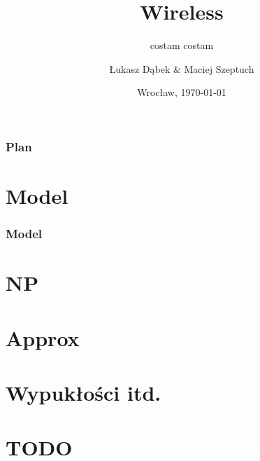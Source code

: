\documentclass[slidestop, compress, 10pt]{beamer}
\title{Wireless}
\subtitle{costam costam}
\author{Łukasz Dąbek \& Maciej Szeptuch}
\date{Wrocław, \today}
\begin{document}
\begin{frame}
    \titlepage
\end{frame}

\begin{frame}
    \frametitle{Plan}
    \tableofcontents
\end{frame}

\section{Model}
    \begin{frame}
        \frametitle{Model}
    \end{frame}

\section{NP}
\section{Approx}
\section{Wypukłości itd.}
\section{TODO}
\end{document}
